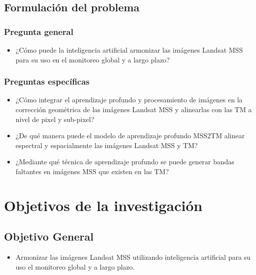         \subsection{Formulación del problema}
            \subsubsection{Pregunta general}
            \begin{itemize}
                \item[-] ¿Cómo puede la inteligencia artificial armonizar las imágenes Landsat MSS para su uso en el monitoreo global y a largo plazo?
            \end{itemize}
            \subsubsection{Preguntas específicas}
                \begin{itemize}
                    \item[-] ¿Cómo integrar el aprendizaje profundo y procesamiento de imágenes en la corrección geométrica de las imágenes Landsat MSS y alinearlas con las TM a nivel de pixel y sub-pixel?
                    \item[-] ¿De qué manera puede el modelo de aprendizaje profundo MSS2TM alinear espectral y espacialmente las imágenes Landsat MSS y TM?
                    \item[-] ¿Mediante qué técnica de aprendizaje profundo se puede generar bandas faltantes en imágenes MSS que existen en las TM?
                \end{itemize}
    \section{Objetivos de la investigación}
        \subsection{Objetivo General}
            \begin{itemize}
                \item[-]Armonizar las imágenes Landsat MSS utilizando inteligencia artificial para su uso el monitoreo global y a largo plazo.
            \end{itemize}
